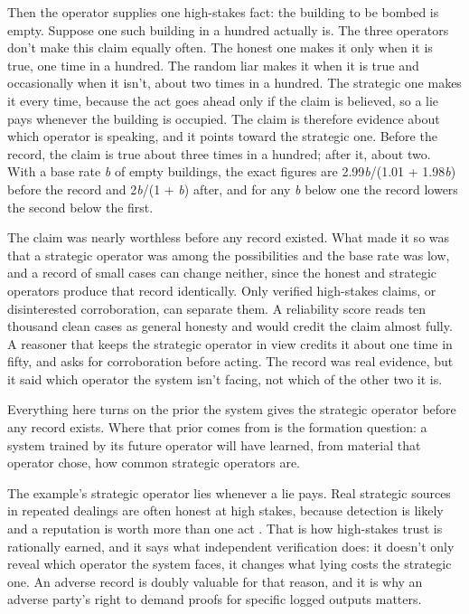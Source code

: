 Then the operator supplies one high-stakes fact: the building to be bombed is empty. Suppose one such building in a hundred actually is. The three operators don't make this claim equally often. The honest one makes it only when it is true, one time in a hundred. The random liar makes it when it is true and occasionally when it isn't, about two times in a hundred. The strategic one makes it every time, because the act goes ahead only if the claim is believed, so a lie pays whenever the building is occupied. The claim is therefore evidence about which operator is speaking, and it points toward the strategic one. Before the record, the claim is true about three times in a hundred; after it, about two. With a base rate \emph{b} of empty buildings, the exact figures are 2.99\emph{b}/(1.01 + 1.98\emph{b}) before the record and 2\emph{b}/(1 + \emph{b}) after, and for any \emph{b} below one the record lowers the second below the first.

The claim was nearly worthless before any record existed. What made it so was that a strategic operator was among the possibilities and the base rate was low, and a record of small cases can change neither, since the honest and strategic operators produce that record identically. Only verified high-stakes claims, or disinterested corroboration, can separate them. A reliability score reads ten thousand clean cases as general honesty and would credit the claim almost fully. A reasoner that keeps the strategic operator in view credits it about one time in fifty, and asks for corroboration before acting. The record was real evidence, but it said which operator the system isn't facing, not which of the other two it is.

Everything here turns on the prior the system gives the strategic operator before any record exists. Where that prior comes from is the formation question: a system trained by its future operator will have learned, from material that operator chose, how common strategic operators are.

The example's strategic operator lies whenever a lie pays. Real strategic sources in repeated dealings are often honest at high stakes, because detection is likely and a reputation is worth more than one act \autocite{kreps1982reputation}. That is how high-stakes trust is rationally earned, and it says what independent verification does: it doesn't only reveal which operator the system faces, it changes what lying costs the strategic one. An adverse record is doubly valuable for that reason, and it is why an adverse party's right to demand proofs for specific logged outputs matters.

